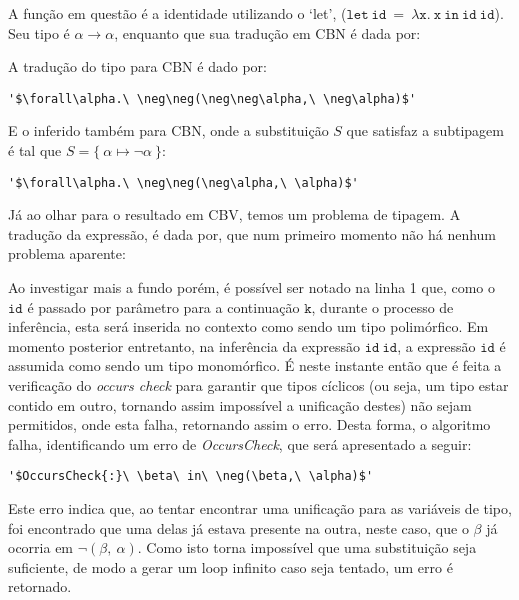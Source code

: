 A função em questão é a identidade utilizando o `let', ($\mathtt{let\ id\ =\ \lambda x.\ x\ in\ id\ id}$).
Seu tipo é $\alpha \to \alpha$, enquanto que sua tradução em CBN é dada por:

A tradução do tipo para CBN é dado por:
\lstset{extendedchars=false, escapeinside=''}
\begin{lstlisting}[style=output,caption={Tradução em CBN da identidade com `let'}]
  '$\forall\alpha.\ \neg\neg(\neg\neg\alpha,\ \neg\alpha)$'
\end{lstlisting}
E o inferido também para CBN, onde a substituição $S$ que satisfaz a subtipagem é tal que $S = \{\ \alpha \mapsto \neg\alpha \ \}$:
\lstset{extendedchars=false, escapeinside=''}
\begin{lstlisting}[style=output,caption={Inferência da identidade com `let' traduzido em CBN}]
  '$\forall\alpha.\ \neg\neg(\neg\alpha,\ \alpha)$'
\end{lstlisting}
Já ao olhar para o resultado em CBV, temos um problema de tipagem.
A tradução da expressão, é dada por, que num primeiro momento não há nenhum problema aparente:

Ao investigar mais a fundo porém, é possível ser notado na linha 1 que, como o $\mathtt{id}$ é passado por parâmetro para a continuação $\mathtt{k}$, durante o processo de inferência, esta será inserida no contexto como sendo um tipo polimórfico.
Em momento posterior entretanto, na inferência da expressão $\mathtt{id\ id}$, a expressão $\mathtt{id}$ é assumida como sendo um tipo monomórfico.
É neste instante então que é feita a verificação do \textit{occurs check} para garantir que tipos cíclicos (ou seja, um tipo estar contido em outro, tornando assim impossível a unificação destes) não sejam permitidos, onde esta falha, retornando assim o erro.
Desta forma, o algoritmo falha, identificando um erro de \textit{OccursCheck}, que será apresentado a seguir:
\lstset{extendedchars=false, escapeinside=''}
\begin{lstlisting}[style=output,caption={Erro de Inferência da identidade com `let' traduzido em CBV}]
  '$OccursCheck{:}\ \beta\ in\ \neg(\beta,\ \alpha)$'
\end{lstlisting}
Este erro indica que, ao tentar encontrar uma unificação para as variáveis de tipo, foi encontrado que uma delas já estava presente na outra, neste caso, que o $\beta$ já ocorria em $\neg(\beta,\ \alpha)$.
Como isto torna impossível que uma substituição seja suficiente, de modo a gerar um loop infinito caso seja tentado, um erro é retornado.

